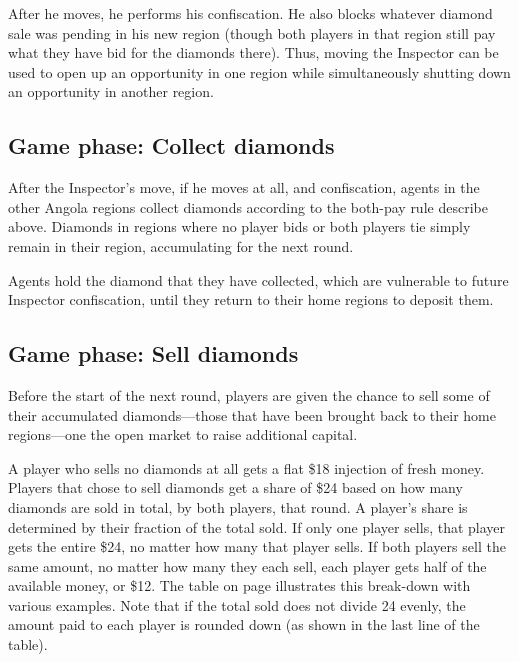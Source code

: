 \documentclass[8pt]{extbook}
\begin{document}
After he moves, he performs his confiscation.  He also blocks whatever diamond sale was pending in his new region (though both players in that region still pay what they have bid for the diamonds there).  Thus, moving the Inspector can be used to open up an opportunity in one region while simultaneously shutting down an opportunity in another region.

\subsection{Game phase:  Collect diamonds}

After the Inspector's move, if he moves at all, and confiscation, agents in the other Angola regions collect diamonds according to the both-pay rule describe above.  Diamonds in regions where no player bids or both players tie simply remain in their region, accumulating for the next round.

Agents hold the diamond that they have collected, which are vulnerable to future Inspector confiscation, until they return to their home regions to deposit them.


\subsection{Game phase:  Sell diamonds}
\label{sec:sellPhase}

Before the start of the next round, players are given the chance to sell some of their accumulated diamonds---those that have been brought back to their home regions---one the open market to raise additional capital.

A player who sells no diamonds at all gets a flat \$18 injection of fresh money.  Players that chose to sell diamonds get a share of \$24 based on how many diamonds are sold in total, by both players, that round.  A player's share is determined by their fraction of the total sold.  If only one player sells, that player gets the entire \$24, no matter how many that player sells.  If both players sell the same amount, no matter how many they each sell, each player gets half of the available money, or \$12.  The table on page \pageref{fig:sellTable} illustrates this break-down with various examples.  Note that if the total sold does not divide 24 evenly, the amount paid to each player is rounded down (as shown in the last line of the table).
\end{document}
